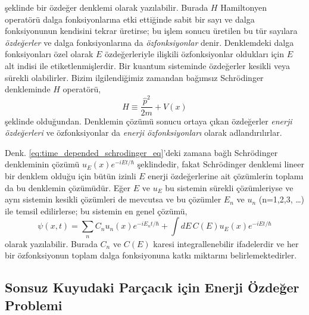 \documentclass[00_kitap.tex]{subfiles}
\begin{document}
şeklinde bir özdeğer denklemi olarak yazılabilir. Burada $H$ Hamiltonyen operatörü dalga fonksiyonlarına etki ettiğinde sabit bir sayı ve dalga fonksiyonunun kendisini tekrar üretirse; bu işlem sonucu üretilen bu tür sayılara \emph{özdeğerler} ve dalga fonksiyonlarına da \emph{özfonksiyonlar} denir. Denklemdeki dalga fonksiyonları özel olarak $E$ özdeğerleriyle ilişkili özfonksiyonlar oldukları için $E$ alt indisi ile etiketlenmişlerdir. Bir kuantum sisteminde özdeğerler kesikli veya sürekli olabilirler. Bizim ilgilendiğimiz zamandan bağımsız Schrödinger denkleminde $H$ operatörü,
\begin{equation}
H\equiv\frac{\hat p^{2}}{2 m}+V(x)
\end{equation}
şeklinde olduğundan. Denklemin çözümü sonucu ortaya çıkan özdeğerler \emph{enerji özdeğerleri} ve özfonksiyonlar da \emph{enerji özfonksiyonları} olarak adlandırılırlar.

Denk. \ref{eq:time_depended_schrodinger_eq}'deki zamana bağlı Schrödinger denkleminin çözümü $u_{E}(x) e ^ { - i E t / \hbar }$ şeklindedir, fakat Schrödinger denklemi lineer bir denklem olduğu için bütün izinli $E$ enerji özdeğerlerine ait çözümlerin toplamı da bu denklemin çözümüdür. Eğer $E$ ve $u_{E}$ bu sistemin sürekli çözümleriyse ve aynı sistemin kesikli çözümleri de mevcutsa ve bu çözümler $E_n$ ve $u_{n}$ (n=1,2,3, \ldots) ile temsil edilirlerse;
bu sistemin en genel çözümü,
\begin{equation}
\psi ( x , t ) = \sum _ { n } C _ { n } u _ { n } ( x ) e ^ { - i E _ { n } t / \hbar } + \int d E \, C ( E ) u _ { E } ( x ) e ^ { - i E t / \hbar }
\end{equation}
olarak yazılabilir. Burada $C_n$ ve $C(E)$ karesi integrallenebilir ifadelerdir ve her bir özfonksiyonun toplam dalga fonksiyonuna katkı miktarını belirlemektedirler.

\subsection{Sonsuz Kuyudaki Parçacık için Enerji Özdeğer Problemi}
\end{document}
